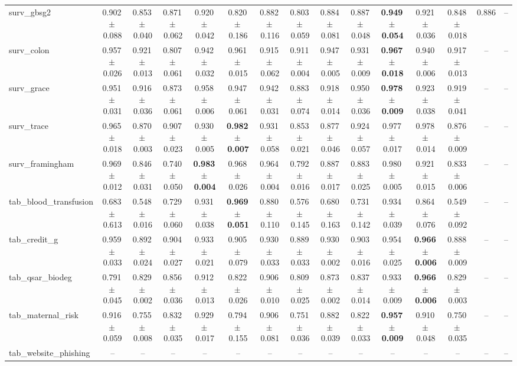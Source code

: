 \documentclass[8pt]{extarticle}
\begin{document}
\begin{longtable}{l*{14}{c}}
surv\_gbsg2 & 0.902\,$\pm$\,0.088 & 0.853\,$\pm$\,0.040 & 0.871\,$\pm$\,0.062 & 0.920\,$\pm$\,0.042 & 0.820\,$\pm$\,0.186 & 0.882\,$\pm$\,0.116 & 0.803\,$\pm$\,0.059 & 0.884\,$\pm$\,0.081 & 0.887\,$\pm$\,0.048 & \textbf{0.949\,$\pm$\,0.054} & 0.921\,$\pm$\,0.036 & 0.848\,$\pm$\,0.018 & 0.886 & -- \\
surv\_colon & 0.957\,$\pm$\,0.026 & 0.921\,$\pm$\,0.013 & 0.807\,$\pm$\,0.061 & 0.942\,$\pm$\,0.032 & 0.961\,$\pm$\,0.015 & 0.915\,$\pm$\,0.062 & 0.911\,$\pm$\,0.004 & 0.947\,$\pm$\,0.005 & 0.931\,$\pm$\,0.009 & \textbf{0.967\,$\pm$\,0.018} & 0.940\,$\pm$\,0.006 & 0.917\,$\pm$\,0.013 & -- & -- \\
surv\_grace & 0.951\,$\pm$\,0.031 & 0.916\,$\pm$\,0.036 & 0.873\,$\pm$\,0.061 & 0.958\,$\pm$\,0.006 & 0.947\,$\pm$\,0.061 & 0.942\,$\pm$\,0.031 & 0.883\,$\pm$\,0.074 & 0.918\,$\pm$\,0.014 & 0.950\,$\pm$\,0.036 & \textbf{0.978\,$\pm$\,0.009} & 0.923\,$\pm$\,0.038 & 0.919\,$\pm$\,0.041 & -- & -- \\
surv\_trace & 0.965\,$\pm$\,0.018 & 0.870\,$\pm$\,0.003 & 0.907\,$\pm$\,0.023 & 0.930\,$\pm$\,0.005 & \textbf{0.982\,$\pm$\,0.007} & 0.931\,$\pm$\,0.058 & 0.853\,$\pm$\,0.021 & 0.877\,$\pm$\,0.046 & 0.924\,$\pm$\,0.057 & 0.977\,$\pm$\,0.017 & 0.978\,$\pm$\,0.014 & 0.876\,$\pm$\,0.009 & -- & -- \\
surv\_framingham & 0.969\,$\pm$\,0.012 & 0.846\,$\pm$\,0.031 & 0.740\,$\pm$\,0.050 & \textbf{0.983\,$\pm$\,0.004} & 0.968\,$\pm$\,0.026 & 0.964\,$\pm$\,0.004 & 0.792\,$\pm$\,0.016 & 0.887\,$\pm$\,0.017 & 0.883\,$\pm$\,0.025 & 0.980\,$\pm$\,0.005 & 0.921\,$\pm$\,0.015 & 0.833\,$\pm$\,0.006 & -- & -- \\
tab\_blood\_transfusion & 0.683\,$\pm$\,0.613 & 0.548\,$\pm$\,0.016 & 0.729\,$\pm$\,0.060 & 0.931\,$\pm$\,0.038 & \textbf{0.969\,$\pm$\,0.051} & 0.880\,$\pm$\,0.110 & 0.576\,$\pm$\,0.145 & 0.680\,$\pm$\,0.163 & 0.731\,$\pm$\,0.142 & 0.934\,$\pm$\,0.039 & 0.864\,$\pm$\,0.076 & 0.549\,$\pm$\,0.092 & -- & -- \\
tab\_credit\_g & 0.959\,$\pm$\,0.033 & 0.892\,$\pm$\,0.024 & 0.904\,$\pm$\,0.027 & 0.933\,$\pm$\,0.021 & 0.905\,$\pm$\,0.079 & 0.930\,$\pm$\,0.033 & 0.889\,$\pm$\,0.033 & 0.930\,$\pm$\,0.002 & 0.903\,$\pm$\,0.016 & 0.954\,$\pm$\,0.025 & \textbf{0.966\,$\pm$\,0.006} & 0.888\,$\pm$\,0.009 & -- & -- \\
tab\_qsar\_biodeg & 0.791\,$\pm$\,0.045 & 0.829\,$\pm$\,0.002 & 0.856\,$\pm$\,0.036 & 0.912\,$\pm$\,0.013 & 0.822\,$\pm$\,0.026 & 0.906\,$\pm$\,0.010 & 0.809\,$\pm$\,0.025 & 0.873\,$\pm$\,0.002 & 0.837\,$\pm$\,0.014 & 0.933\,$\pm$\,0.009 & \textbf{0.966\,$\pm$\,0.006} & 0.829\,$\pm$\,0.003 & -- & -- \\
tab\_maternal\_risk & 0.916\,$\pm$\,0.059 & 0.755\,$\pm$\,0.008 & 0.832\,$\pm$\,0.035 & 0.929\,$\pm$\,0.017 & 0.794\,$\pm$\,0.155 & 0.906\,$\pm$\,0.081 & 0.751\,$\pm$\,0.036 & 0.882\,$\pm$\,0.039 & 0.822\,$\pm$\,0.033 & \textbf{0.957\,$\pm$\,0.009} & 0.910\,$\pm$\,0.048 & 0.750\,$\pm$\,0.035 & -- & -- \\
tab\_website\_phishing & -- & -- & -- & -- & -- & -- & -- & -- & -- & -- & -- & -- & -- & -- \\
\end{longtable}
\end{document}
